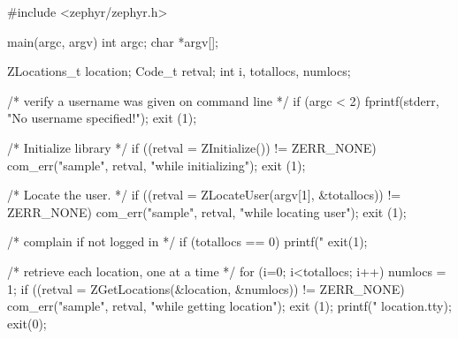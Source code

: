 \begin{code}
#include <zephyr/zephyr.h>

main(argc, argv)
    int argc;
    char *argv[];
{
    ZLocations_t location;
    Code_t retval;
    int i, totallocs, numlocs;

    /* verify a username was given on command line */
    if (argc < 2) {
        fprintf(stderr, "No username specified!\n");
        exit (1);
    }

    /* Initialize library */
    if ((retval = ZInitialize()) != ZERR_NONE) {
        com_err("sample", retval, "while initializing");
        exit (1);
    }

    /* Locate the user. */
    if ((retval = ZLocateUser(argv[1], &totallocs)) != ZERR_NONE) {
        com_err("sample", retval, "while locating user");
        exit (1);
    }

    /* complain if not logged in */
    if (totallocs == 0) {
        printf("%
        exit(1);
    }

    /* retrieve each location, one at a time */
    for (i=0; i<totallocs; i++) {
        numlocs = 1;
        if ((retval = ZGetLocations(&location, &numlocs)) != ZERR_NONE) {
            com_err("sample", retval, "while getting location");
            exit (1);
        }
        printf("%
            location.tty);
    }
    exit(0);
}
\end{code}
